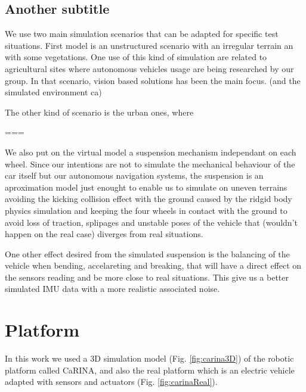 \subsection{Another subtitle}


We use two main simulation scenarios that can be adapted for specific test
situations. First model is an unstructured scenario with an irregular terrain an
with some vegetations. One use of this kind of simulation are related to
agricultural sites where autonomous vehicles usage are being researched by our
group. In that scenario, vision based solutions has been the main focus. (and
the simulated environment ca)

The other kind of scenario is the urban ones, where 



===


We also put on the virtual model a suspension mechanism independant on each
wheel. Since our intentions are not to simulate the mechanical behaviour of the
car itself but our autonomous navigation systems, the suspension is an
aproximation model just enought to enable us to simulate on uneven terrains
avoiding the kicking collision effect with the ground caused by the ridgid body
physics simulation and keeping the four wheels in contact with the ground to
avoid loss of traction, splipages and unstable poses of the vehicle that
(wouldn't happen on the real case) diverges from real situations.

One other effect desired from the simulated suspension is the balancing of the
vehicle when bending, accelareting and breaking, that will have a direct effect
on the sensors reading and be more close to real situations. This give us a
better simulated IMU data with a more realistic associated noise.










 \section{Platform}\label{sec:Plataform}
 
 In this work we used a 3D simulation model (Fig. \ref{fig:carina3D}) of the robotic platform called 
 CaRINA, 
 and also the real platform which is an electric vehicle adapted with sensors and actuators (Fig. \ref{fig:carinaReal}). 
 
